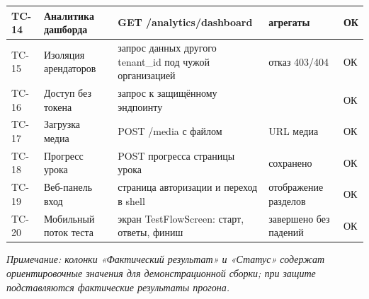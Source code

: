 \begin{table}[H]
{\begin{tabularx}{\textwidth}{|>{\centering\arraybackslash}p{10mm}|>{\RaggedRight\arraybackslash}p{34mm}|>{\RaggedRight\arraybackslash}X|>{\RaggedRight\arraybackslash}p{26mm}|>{\centering\arraybackslash}p{18mm}|}
\hline
TC-14 & Аналитика дашборда & GET /analytics/dashboard & агрегаты & ОК \\
\hline
TC-15 & Изоляция арендаторов & запрос данных другого tenant\_id под чужой организацией & отказ 403/404 & ОК \\
\hline
TC-16 & Доступ без токена & запрос к защищённому эндпоинту & 401 & ОК \\
\hline
TC-17 & Загрузка медиа & POST /media с файлом & URL медиа & ОК \\
\hline
TC-18 & Прогресс урока & POST прогресса страницы урока & сохранено & ОК \\
\hline
TC-19 & Веб-панель вход & страница авторизации и переход в shell & отображение разделов & ОК \\
\hline
TC-20 & Мобильный поток теста & экран TestFlowScreen: старт, ответы, финиш & завершено без падений & ОК \\
\hline
\end{tabularx}
}
\end{table}

\noindent\textit{Примечание: колонки «Фактический результат» и «Статус» содержат ориентировочные значения для демонстрационной сборки; при защите подставляются фактические результаты прогона.}
